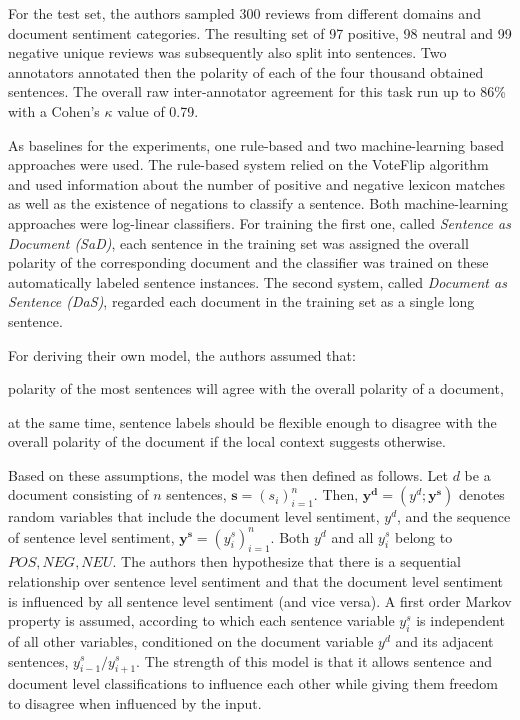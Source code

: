 \documentclass[a4paper,11pt]{article}
\begin{document}
For the test set, the authors sampled 300 reviews from different domains and
document sentiment categories.  The resulting set of 97 positive, 98 neutral
and 99 negative unique reviews was subsequently also split into sentences.
Two annotators annotated then the polarity of each of the four thousand
obtained sentences.  The overall raw inter-annotator agreement for this task
run up to 86\% with a Cohen’s $\kappa$ value of 0.79.

As baselines for the experiments, one rule-based and two machine-learning
based approaches were used.  The rule-based system relied on the VoteFlip
algorithm \cite{Choi-09} and used information about the number of positive and
negative lexicon matches as well as the existence of negations to classify a
sentence.  Both machine-learning approaches were log-linear classifiers.  For
training the first one, called \textit{Sentence as Document (SaD)}, each
sentence in the training set was assigned the overall polarity of the
corresponding document and the classifier was trained on these automatically
labeled sentence instances.  The second system, called \textit{Document as
  Sentence (DaS)}, regarded each document in the training set as a single long
sentence.

For deriving their own model, the authors assumed that:
\begin{inparaenum}
\item polarity of the most sentences will agree with the overall polarity of a
  document,
\item at the same time, sentence labels should be flexible enough to disagree
  with the overall polarity of the document if the local context suggests
  otherwise.
\end{inparaenum}
Based on these assumptions, the model was then defined as follows.  Let $d$ be
a document consisting of $n$ sentences, $\mathbf{s} = (s_i)^n_{i=1}$.  Then,
$\mathbf{y^d} = (y^d; \mathbf{y^s})$ denotes random variables that include the
document level sentiment, $y^d$, and the sequence of sentence level sentiment,
$\mathbf{y^s} = (y^s_i)^n_{i=1}$.  Both $y^d$ and all $y^s_i$ belong to ${POS,
  NEG, NEU}$.  The authors then hypothesize that there is a sequential
relationship over sentence level sentiment and that the document level
sentiment is influenced by all sentence level sentiment (and vice versa).  A
first order Markov property is assumed, according to which each sentence
variable $y^s_i$ is independent of all other variables, conditioned on the
document variable $y^d$ and its adjacent sentences, $y^s_{i-1}/y^s_{i+1}$.
The strength of this model is that it allows sentence and document level
classifications to influence each other while giving them freedom to disagree
when influenced by the input.
\end{document}
